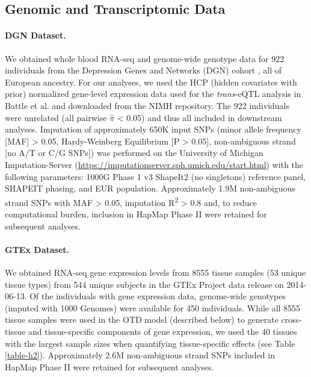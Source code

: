 \documentclass[10pt,letterpaper]{article}
\begin{document}
\subsection*{Genomic and Transcriptomic
Data}\label{genomic-and-transcriptomic-data}

\paragraph*{DGN Dataset.}\label{dgn-dataset}

We obtained whole blood RNA-seq and genome-wide genotype data for 922
individuals from the Depression Genes and Networks (DGN) cohort
\cite{Battle_2013}, all of European ancestry. For our analyses, we used the HCP
(hidden covariates with prior) normalized gene-level expression data
used for the \emph{trans}-eQTL analysis in Battle et al. \cite{Battle_2013} and
downloaded from the NIMH repository. The 922 individuals were unrelated
(all pairwise \(\hat{\pi}\) \textless{} 0.05) and thus all included in
downstream analyses. Imputation of approximately 650K input SNPs (minor
allele frequency {[}MAF{]} \textgreater{} 0.05, Hardy-Weinberg
Equilibrium {[}P \textgreater{} 0.05{]}, non-ambiguous strand {[}no A/T
or C/G SNPs{]}) was performed on the University of Michigan
Imputation-Server
(\url{https://imputationserver.sph.umich.edu/start.html}) \cite{Howie_2012,Fuchsberger_2014}
with the following parameters: 1000G Phase 1 v3 ShapeIt2 (no singletons)
reference panel, SHAPEIT phasing, and EUR population. Approximately 1.9M
non-ambiguous strand SNPs with MAF \textgreater{} 0.05, imputation
R\textsuperscript{2} \textgreater{} 0.8 and, to reduce computational
burden, inclusion in HapMap Phase II were retained for subsequent
analyses.

\paragraph*{GTEx Dataset.}\label{gtex-dataset}

We obtained RNA-seq gene expression levels from 8555 tissue samples (53
unique tissue types) from 544 unique subjects in the GTEx Project \cite{Ardlie_2015} 
data release on 2014-06-13. Of the individuals with gene
expression data, genome-wide genotypes (imputed with 1000 Genomes) were
available for 450 individuals. While all 8555 tissue samples were used
in the OTD model (described below) to generate cross-tissue and
tissue-specific components of gene expression, we used the 40 tissues
with the largest sample sizes when quantifying tissue-specific effects (see Table \ref{table-h2}).
Approximately 2.6M non-ambiguous strand SNPs included in HapMap Phase II were retained for
subsequent analyses.
\end{document}
